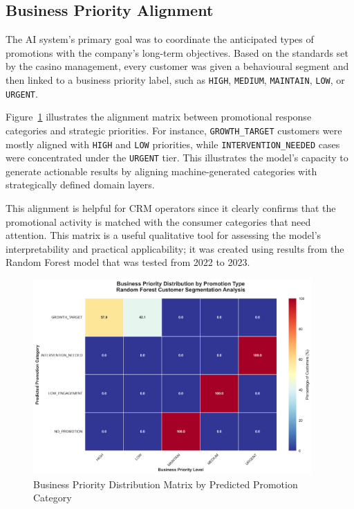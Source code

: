 \documentclass[12pt,a4paper]{report}
\begin{document}
\subsection{Business Priority Alignment}

The AI system's primary goal was to coordinate the anticipated types of promotions with the company's long-term objectives. Based on the standards set by the casino management, every customer was given a behavioural segment and then linked to a business priority label, such as \texttt{HIGH}, \texttt{MEDIUM}, \texttt{MAINTAIN}, \texttt{LOW}, or \texttt{URGENT}.

Figure~\ref{fig:priority-matrix} illustrates the alignment matrix between promotional response categories and strategic priorities. For instance, \texttt{GROWTH\_TARGET} customers were mostly aligned with \texttt{HIGH} and \texttt{LOW} priorities, while \texttt{INTERVENTION\_NEEDED} cases were concentrated under the \texttt{URGENT} tier. This illustrates the model's capacity to generate actionable results by aligning machine-generated categories with strategically defined domain layers.

This alignment is helpful for CRM operators since it clearly confirms that the promotional activity is matched with the consumer categories that need attention. This matrix is a useful qualitative tool for assessing the model's interpretability and practical applicability; it was created using results from the Random Forest model that was tested from 2022 to 2023.

\begin{figure}[H]
\centering
\includegraphics[width=0.95\textwidth]{figures/priority_distribution_matrix.png}
\caption{Business Priority Distribution Matrix by Predicted Promotion Category}
\label{fig:priority-matrix}
\end{figure}
\end{document}
